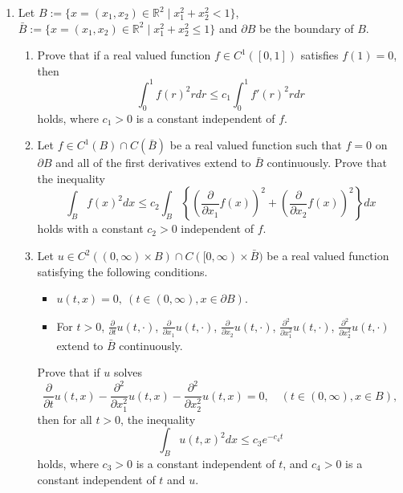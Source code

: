 \documentclass[10pt,a4paper]{article}
\begin{document}
\begin{enumerate}[label=\fbox{\arabic*}]
  \item %
        Let $B := \{ x = (x_1, x_2) \in \mathbb{R}^2 \mid x_1^2 + x_2^2 < 1 \}$, $\bar{B} := \{ x = (x_1, x_2) \in \mathbb{R}^2 \mid x_1^2 + x_2^2 \le 1 \}$ and $\partial B$ be the boundary of $B$.
        \begin{enumerate}[label=(\arabic*)]
          \item Prove that if a real valued function $f \in C^1([0, 1])$ satisfies $f(1) = 0$, then
          \[
            \int_0^1 f(r)^2 r dr \le c_1 \int_0^1 f'(r)^2 r dr
          \]
          holds, where $c_1 > 0$ is a constant independent of $f$.
          \item Let $f \in C^1(B) \cap C(\bar{B})$ be a real valued function such that $f = 0$ on $\partial B$ and all of the first derivatives extend to $\bar{B}$ continuously. Prove that the inequality
          \[
            \int_B f(x)^2 dx \le c_2 \int_B \left\{ \left( \frac{\partial}{\partial x_1} f(x) \right)^2 + \left( \frac{\partial}{\partial x_2} f(x) \right)^2 \right\} dx
          \]
          holds with a constant $c_2 > 0$ independent of $f$.
          \item Let $u \in C^2((0, \infty) \times B) \cap C([0, \infty) \times \bar{B})$ be a real valued function satisfying the following conditions.
          \begin{itemize}
            \item $u(t, x) = 0, \ (t \in (0, \infty), x \in \partial B)$.
            \item For $t > 0$, $\frac{\partial}{\partial t} u(t, \cdot)$, $\frac{\partial}{\partial x_1} u(t, \cdot)$, $\frac{\partial}{\partial x_2} u(t, \cdot)$, $\frac{\partial^2}{\partial x_1^2} u(t, \cdot)$, $\frac{\partial^2}{\partial x_2^2} u(t, \cdot)$ extend to $\bar{B}$ continuously.
          \end{itemize}
          Prove that if $u$ solves
          \[
            \frac{\partial}{\partial t} u(t, x) - \frac{\partial^2}{\partial x_1^2} u(t, x) - \frac{\partial^2}{\partial x_2^2} u(t, x) = 0, \quad (t \in (0, \infty), x \in B),
          \]
          then for all $t > 0$, the inequality
          \[
            \int_B u(t, x)^2 dx \le c_3 e^{-c_4 t}
          \]
          holds, where $c_3 > 0$ is a constant independent of $t$, and $c_4 > 0$ is a constant independent of $t$ and $u$.
        \end{enumerate}


\end{enumerate}
\end{document}

